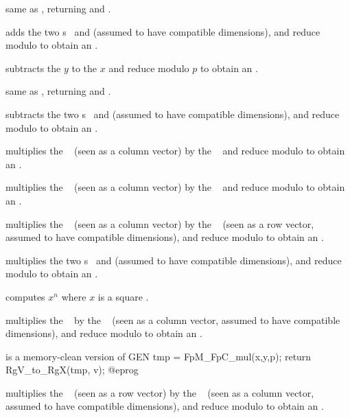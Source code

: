  same as , returning and
.

 adds the two s~
and  (assumed to have compatible dimensions), and reduce modulo
 to obtain an .

 subtracts the  $y$ to
the  $x$ and reduce modulo $p$ to obtain an .

 same as , returning and
.

 subtracts the two s~
and  (assumed to have compatible dimensions), and reduce modulo
 to obtain an .

 multiplies the ~
(seen as a column vector) by the ~ and reduce modulo  to
obtain an .

 multiplies the ~
(seen as a column vector) by the ~ and reduce modulo  to
obtain an .

 multiplies the ~
(seen as a column vector) by the ~ (seen as a row vector,
assumed to have compatible dimensions), and reduce modulo  to obtain
an .

 multiplies the two s~
and  (assumed to have compatible dimensions), and reduce modulo
 to obtain an .

 computes $x^n$ where $x$ is a
square .

 multiplies the ~
by the ~ (seen as a column vector, assumed to have compatible
dimensions), and reduce modulo  to obtain an .

 is a memory-clean
version of
\bprog
  GEN tmp = FpM_FpC_mul(x,y,p);
  return RgV_to_RgX(tmp, v);
@eprog

 multiplies the ~
(seen as a row vector) by the ~ (seen as a column vector,
assumed to have compatible dimensions), and reduce modulo  to obtain
an .


